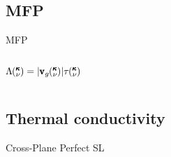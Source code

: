 \documentclass{beamer}
\newcommand{\kv}{\mspace{-4.0mu}\left(\mspace{-8.0mu}
\begin{smallmatrix}&\pmb{\kappa} \\&\nu\end{smallmatrix}
\mspace{-3.0mu}\right)}
\begin{document}
\subsection{MFP}
\begin{frame}{MFP}
\begin{columns}
$\Lambda \kv=|{\pmb{\mathrm{v}}_{g}\kv}|{\tau\kv}$
\begin{figure}[t]
\begin{center}
\vspace*{-1.5cm}
\renewcommand{\figure}{Fig.}
\label{fig:mfp_contribution}
\end{center}
\end{figure}
\end{columns}
\end{frame}




\subsection{Thermal conductivity}
\begin{frame}{Cross-Plane Perfect SL}
\begin{figure}[t]
\begin{center}
\vspace*{-0.8cm}
\renewcommand{\figure}{Fig.}
\label{fig:cp}
\end{center}
\end{figure}
\end{frame}
\end{document}
